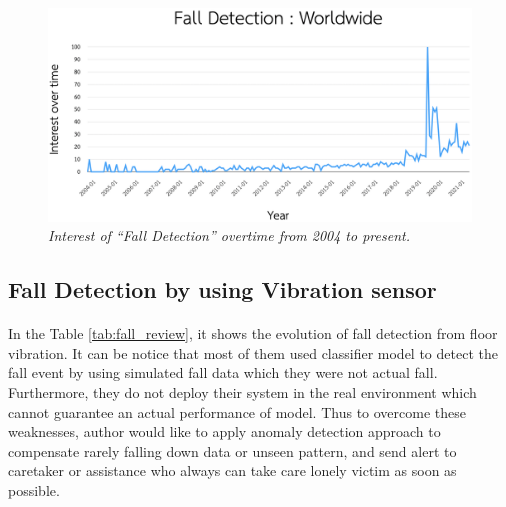 \begin{figure}[H]
  \centering
  \caption[Fall detection trend]{\emph{Interest of “Fall Detection” overtime from 2004 to present.}}\label{fig:fall_trend}
  \includegraphics[width=\textwidth]{figures/fall_trend.png}  
\end{figure}

\subsection{Fall Detection by using Vibration sensor}
\paragraph{}
In the Table \ref{tab:fall_review}, it shows the evolution of fall detection from floor vibration. It can be notice that most of them used classifier model to detect the fall event by using simulated fall data which they were not actual fall. Furthermore, they do not deploy their system in the real environment which cannot guarantee an actual performance of model. Thus to overcome these weaknesses, author would like to apply anomaly detection approach to compensate rarely falling down data or unseen pattern, and send alert to caretaker or assistance who always can take care lonely victim as soon as possible.

